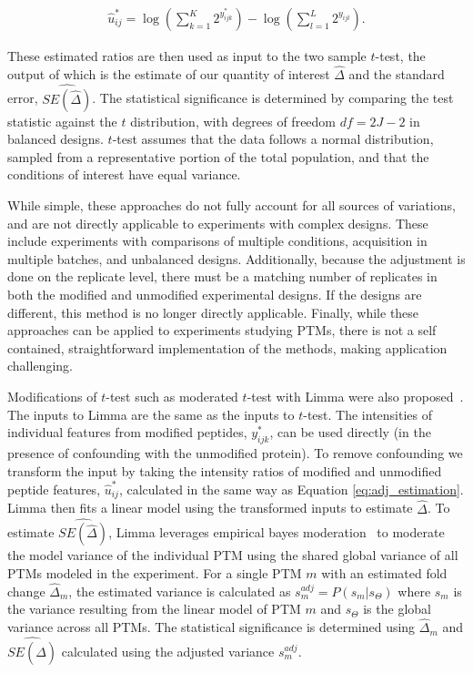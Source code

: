 \documentclass[mcp]{article}
\numberwithin{table}{section}
\begin{document}
\begin{equation}
\begin{aligned}
\hat{u}^{\ast}_{ij} = \log \left( \sum_{k=1}^{K} 2^{y_{ijk}^{\ast}} \right) - \log \left( \sum_{l=1}^{L} 2^{y_{ijl}} \right).
\end{aligned}
\label{eq:adj_estimation}
\end{equation}

These estimated ratios are then used as input to the two sample $t$-test, the output of which is the estimate of our quantity of interest $\hat{\Delta}$ and the standard error, $\widehat{SE(\hat{\Delta})}$. The statistical significance is determined by comparing the test statistic against the $t$ distribution, with degrees of freedom $df=2J-2$ in balanced designs. $t$-test assumes that the data follows a normal distribution, sampled from a representative portion of the total population, and that the conditions of interest have equal variance.

While simple, these approaches do not fully account for all sources of variations, and are not directly applicable to experiments with complex designs. These include experiments with comparisons of multiple conditions, acquisition in multiple batches, and unbalanced designs. Additionally, because the adjustment is done on the replicate level, there must be a matching number of replicates in both the modified and unmodified experimental designs. If the designs are different, this method is no longer directly applicable. Finally, while these approaches can be applied to experiments studying PTMs, there is not a self contained, straightforward implementation of the methods, making application challenging.

\medskip {} Modifications of $t$-test such as moderated $t$-test with Limma were also proposed~\cite{Ritchie_15a}\cite{Zhu}\cite{Chappell:2021}. The inputs to  Limma are the same as the inputs to $t$-test. The intensities of individual features from modified peptides, $y_{ijk}^{\ast}$, can be used directly (in the presence of confounding with the unmodified protein). To remove confounding we transform the input by taking the intensity ratios of modified and unmodified peptide features, $\hat{u}^{\ast}_{ij}$, calculated in the same way as Equation \ref{eq:adj_estimation}. Limma then fits a linear model using the transformed inputs to estimate $\hat{\Delta}$. To estimate $\widehat{SE(\hat{\Delta})}$, Limma leverages empirical bayes moderation~\cite{Robbins1992} to moderate the model variance of the individual PTM using the shared global variance of all PTMs modeled in the experiment. For a single PTM $m$ with an estimated fold change $\hat{\Delta}_m$, the estimated variance is calculated as $s^{adj}_{m} = P(s_{m}| s_\Theta)$ where $s_{m}$ is the variance resulting from the linear model of PTM $m$ and $s_\Theta$ is the global variance across all PTMs. The statistical significance is determined using $\hat{\Delta}_m$ and $\widehat{SE(\hat{\Delta})}$ calculated using the adjusted variance $s^{adj}_{m}$.
\end{document}
